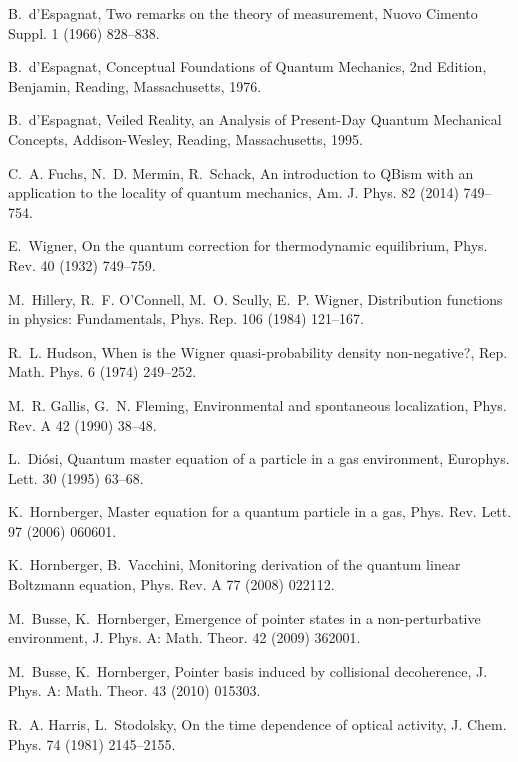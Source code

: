 \documentclass[3p,sort&compress]{elsarticle}
\begin{document}
\begin{thebibliography}{100}
B.~{d'E}spagnat, Two remarks on the theory of measurement, Nuovo Cimento Suppl.
  1 (1966) 828--838.

B.~{d'E}spagnat, Conceptual Foundations of Quantum Mechanics, 2nd Edition,
  Benjamin, Reading, Massachusetts, 1976.

B.~{d'E}spagnat, Veiled Reality, an Analysis of Present-Day Quantum Mechanical
  Concepts, Addison-Wesley, Reading, Massachusetts, 1995.

C.~A. Fuchs, N.~D. Mermin, R.~Schack, An introduction to {QBism} with an
  application to the locality of quantum mechanics, Am. J. Phys. 82 (2014)
  749--754.

E.~Wigner, On the quantum correction for thermodynamic equilibrium, Phys. Rev.
  40 (1932) 749--759.

M.~Hillery, R.~F. {O'C}onnell, M.~O. Scully, E.~P. Wigner, Distribution
  functions in physics: {F}undamentals, Phys. Rep. 106 (1984) 121--167.

R.~L. Hudson, When is the {W}igner quasi-probability density non-negative?,
  Rep. Math. Phys. 6 (1974) 249--252.

M.~R. Gallis, G.~N. Fleming, Environmental and spontaneous localization, Phys.
  Rev. A 42 (1990) 38--48.

L.~Di{\'o}si, Quantum master equation of a particle in a gas environment,
  Europhys. Lett. 30 (1995) 63--68.

K.~Hornberger, Master equation for a quantum particle in a gas, Phys. Rev.
  Lett. 97 (2006) 060601.

K.~Hornberger, B.~Vacchini, Monitoring derivation of the quantum linear
  {B}oltzmann equation, Phys. Rev. A 77 (2008) 022112.

M.~Busse, K.~Hornberger, Emergence of pointer states in a non-perturbative
  environment, J. Phys. A: Math. Theor. 42 (2009) 362001.

M.~Busse, K.~Hornberger, Pointer basis induced by collisional decoherence, J.
  Phys. A: Math. Theor. 43 (2010) 015303.

R.~A. Harris, L.~Stodolsky, On the time dependence of optical activity, J.
  Chem. Phys. 74 (1981) 2145--2155.


\end{thebibliography}
\end{document}
